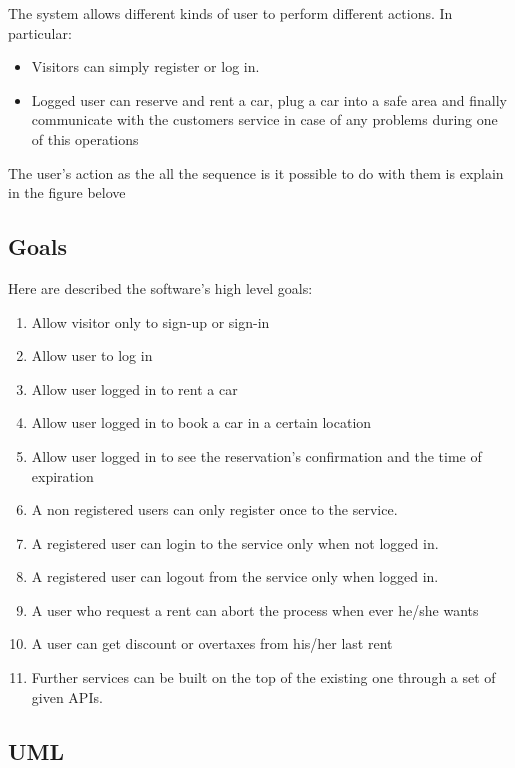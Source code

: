 The system allows different kinds of user to perform different actions. In particular:
\begin{itemize}
	\item Visitors can simply register or log in.
	\item Logged user can reserve and rent a car, plug a car into a safe area and finally communicate with the customers service in case of any problems during one of this operations
\end{itemize}
The user's action as the all the sequence is it possible to do with them is explain in the figure belove

\subsection{Goals}
Here are described the software's high level goals:
\begin{enumerate}[label=\subscript{G}{\arabic*}]
	\item Allow visitor only to sign-up or sign-in
	\item Allow user to log in
	\item Allow user logged in to rent a car
	\item Allow user logged in to book a car in a certain location
	\item Allow user  logged in to see the reservation's confirmation and the time of expiration
	\item A non registered users can only register once to the service.
	\item A registered user can login to the service only when not logged in.
	\item A registered user can logout from the service only when logged in.
	\item A user who request a rent can abort the process when ever he/she wants
	\item A user can get discount or overtaxes from his/her last rent
	\item Further services can be built on the top of the existing one through a set of given APIs.
\end{enumerate}

\subsection{UML}	
\newpage
